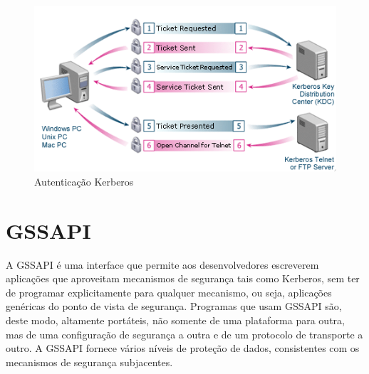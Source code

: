  
\begin{figure}[ht]
   	\centering
    \includegraphics[width=0.9 \textwidth]{figuras/kerberos} 
   	\caption{Autenticação Kerberos \cite{KERBEROS}}
    \label{kerberos}
\end{figure}

 




\section{GSSAPI}

A GSSAPI é uma interface que permite aos desenvolvedores escreverem aplicações que aproveitam mecanismos de segurança tais como Kerberos, sem ter de programar explicitamente para qualquer mecanismo, ou seja, aplicações genéricas do ponto de vista de segurança. Programas que usam GSSAPI são, deste modo, altamente portáteis, não somente de uma plataforma para outra, mas de uma configuração de segurança a outra e de um protocolo de transporte a outro. A GSSAPI fornece vários níveis de proteção de dados, consistentes com os mecanismos de segurança subjacentes.\cite{HUGO}